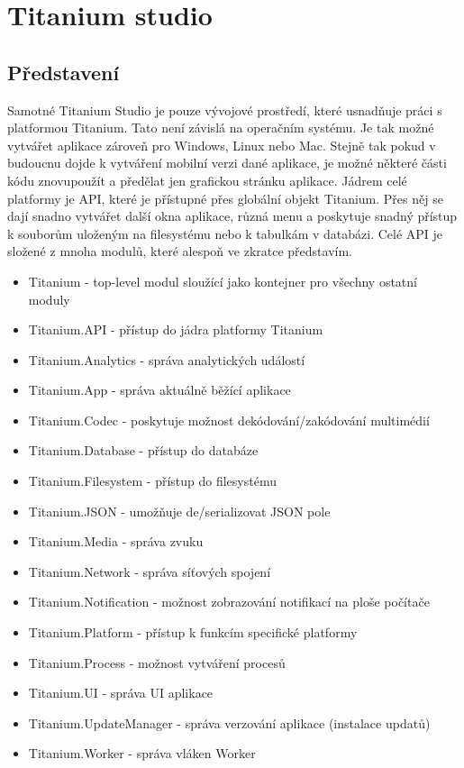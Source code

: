 \section{Titanium studio}

\subsection{Představení}

Samotné Titanium Studio je pouze vývojové prostředí, které usnadňuje práci s platformou Titanium. Tato není závislá na operačním systému. Je tak možné vytvářet aplikace zároveň pro Windows, Linux nebo Mac. Stejně tak pokud v budoucnu dojde k vytváření mobilní verzi dané aplikace, je možné některé části kódu znovupoužít a předělat jen grafickou stránku aplikace. Jádrem celé platformy je API\cite{titanium:api}, které je přístupné přes globální objekt Titanium. Přes něj se dají snadno vytvářet další okna aplikace, různá menu a poskytuje snadný přístup k souborům uloženým na filesystému nebo k tabulkám v databázi. Celé API je složené z mnoha modulů, které alespoň ve zkratce představím.

\begin{itemize}
\item Titanium - top-level modul sloužící jako kontejner pro všechny ostatní moduly
\item Titanium.API - přístup do jádra platformy Titanium
\item Titanium.Analytics - správa analytických událostí
\item Titanium.App - správa aktuálně běžící aplikace
\item Titanium.Codec - poskytuje možnost dekódování/zakódování multimédií
\item Titanium.Database - přístup do databáze
\item Titanium.Filesystem - přístup do filesystému
\item Titanium.JSON - umožňuje de/serializovat JSON pole
\item Titanium.Media - správa zvuku
\item Titanium.Network - správa síťových spojení
\item Titanium.Notification - možnost zobrazování notifikací na ploše počítače
\item Titanium.Platform - přístup k funkcím specifické platformy
\item Titanium.Process - možnost vytváření procesů
\item Titanium.UI - správa UI aplikace
\item Titanium.UpdateManager - správa verzování aplikace (instalace updatů)
\item Titanium.Worker - správa vláken Worker
\end{itemize}


